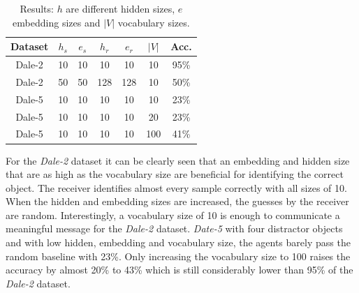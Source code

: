 \documentclass[11pt]{article}
\begin{document}
\begin{table}[b]
  \centering
  \begin{tabular}{c|ccccc|c}
    \hline
    \textbf{Dataset} & $h_{s}$ & $e_{s}$ & $h_{r}$ & $e_{r}$ & $|V|$ & \textbf{Acc.} \\
    \hline
    Dale-2           & {10}    & {10}    & {10}    & {10}    & {10}  & {95\%}        \\
    Dale-2           & {50}    & {50}    & {128}   & {128}   & {10}  & {50\%}        \\
    Dale-5           & {10}    & {10}    & {10}    & {10}    & {10}  & {23\%}        \\
    Dale-5           & {10}    & {10}    & {10}    & {10}    & {20}  & {23\%}        \\
    Dale-5           & {10}    & {10}    & {10}    & {10}    & {100} & {41\%}        \\
    \hline
  \end{tabular}
  \caption{Results: $h$ are different hidden sizes, $e$ embedding sizes and $|V|$ vocabulary sizes.}
  \label{tab:results}
\end{table}

For the \emph{Dale-2} dataset it can be clearly seen that an embedding and hidden size that are as high as the vocabulary size are beneficial for identifying the correct object.
The receiver identifies almost every sample correctly with all sizes of 10.
When the hidden and embedding sizes are increased, the guesses by the receiver are random.
Interestingly, a vocabulary size of 10 is enough to communicate a meaningful message for the \emph{Dale-2} dataset.
%
%
\emph{Date-5} with four distractor objects and with low hidden, embedding and vocabulary size, the agents barely pass the random baseline with 23\%.
Only increasing the vocabulary size to 100 raises the accuracy by almost 20\% to 43\% which is still considerably lower than 95\% of the \emph{Dale-2} dataset.

\end{document}

